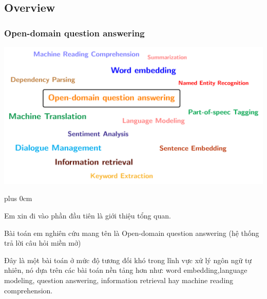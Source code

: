\documentclass[11pt]{beamer}
\renewcommand{\raggedright}{\leftskip=0pt \rightskip=0pt plus 0cm}
\let\olditemize=\itemize
\renewenvironment{itemize}{\olditemize\raggedright}{\endlist}
\begin{document}
\subsection{Overview}
\begin{frame}
	\frametitle{Open-domain question answering}
	\hspace*{-15pt}
	\includegraphics[scale=.45]{images/PDF/nlptask/nlptask.pdf}
\end{frame}
\begin{frame}
	\begin{itemize}
		\item Em xin đi vào phần đầu tiên là giới thiệu tổng quan.
		\item Bài toán em nghiên cứu mang tên là Open-domain question answering (hệ thống trả lời câu hỏi miền mở)
		\item Đây là một bài toán ở mức độ tương đối khó trong lĩnh vực xử lý ngôn ngữ tự nhiên, nó dựa trên các bài toán nền tảng hơn như: word embedding,language modeling, question answering, information retrieval hay machine reading comprehension.
	\end{itemize}
\end{frame}
\end{document}
